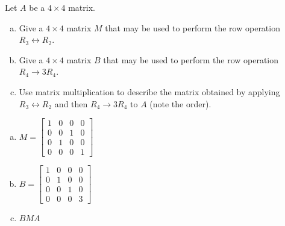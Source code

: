 
\begin{exerciseStatement}


Let \(A\) be a \(4 \times 4\) matrix.


\begin{enumerate}[(a)]
\item Give a \(4 \times 4\) matrix \(M\) that may be used to perform the row operation \( R_3 \leftrightarrow R_2 \).
\item Give a \(4 \times 4\) matrix \(B\) that may be used to perform the row operation \( R_4 \to 3R_4 \).
\item Use matrix multiplication to describe the matrix obtained by applying \( R_3 \leftrightarrow R_2 \) and then \( R_4 \to 3R_4 \) to \(A\) (note the order). 
\end{enumerate}
    
\end{exerciseStatement}
    
\begin{exerciseAnswer} 

\begin{enumerate}[(a)]
\item \(M= \left[\begin{array}{cccc}
1 & 0 & 0 & 0 \\
0 & 0 & 1 & 0 \\
0 & 1 & 0 & 0 \\
0 & 0 & 0 & 1
\end{array}\right] \)
\item \(B= \left[\begin{array}{cccc}
1 & 0 & 0 & 0 \\
0 & 1 & 0 & 0 \\
0 & 0 & 1 & 0 \\
0 & 0 & 0 & 3
\end{array}\right] \)
\item \(BMA\)
\end{enumerate}
    
\end{exerciseAnswer}
    
